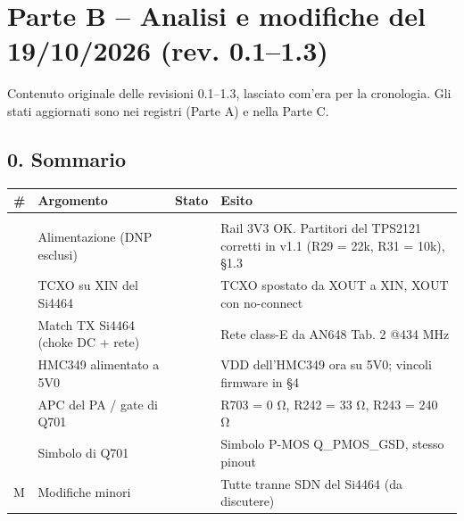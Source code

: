 \clearpage
\section[Parte B – Analisi e modifiche del 19/\allowbreak{}10/\allowbreak{}2026 (rev. 0.1–1.3)]{Parte B – Analisi e modifiche del 19/\allowbreak{}10/\allowbreak{}2026 (rev. 0.1–1.3)}

{\small Contenuto originale delle revisioni 0.1–1.3, lasciato com'era per la cronologia. Gli stati aggiornati sono nei registri (Parte A) e nella Parte C.}

\subsection[0. Sommario]{0. Sommario}

{\footnotesize{}\setlength{\tabcolsep}{4pt}\renewcommand{\arraystretch}{1.1}
\begin{xltabular}{\linewidth}{>{\hsize\raggedright\arraybackslash}X>{\hsize\raggedright\arraybackslash}X>{\hsize\raggedright\arraybackslash}X>{\hsize\raggedright\arraybackslash}X}
\toprule
\textbf{\#} & \textbf{Argomento} & \textbf{Stato} & \textbf{Esito} \\
\midrule
\endhead
\midrule[0.15pt]\\\bottomrule\endfoot
\bottomrule{} & Alimentazione (DNP esclusi) &  & Rail 3V3 OK. Partitori del TPS2121 corretti in v1.1 (R29 = 22k, R31 = 10k), §1.3 \\ & TCXO su XIN del Si4464 &  & TCXO spostato da XOUT a XIN, XOUT con no-connect \\ & Match TX Si4464 (choke DC + rete) &  & Rete class-E da AN648 Tab. 2 @434 MHz \\ & HMC349 alimentato a 5V0 &  & VDD dell'HMC349 ora su 5V0; vincoli firmware in §4 \\ & APC del PA /\allowbreak{} gate di Q701 &  & R703 = 0 Ω, R242 = 33 Ω, R243 = 240 Ω \\ & Simbolo di Q701 &  & Simbolo P-MOS Q\_\allowbreak{}PMOS\_\allowbreak{}GSD, stesso pinout \\\midrule[0.15pt]
M & Modifiche minori &  & Tutte tranne SDN del Si4464 (da discutere) \\\midrule[0.15pt]

\end{xltabular}}
